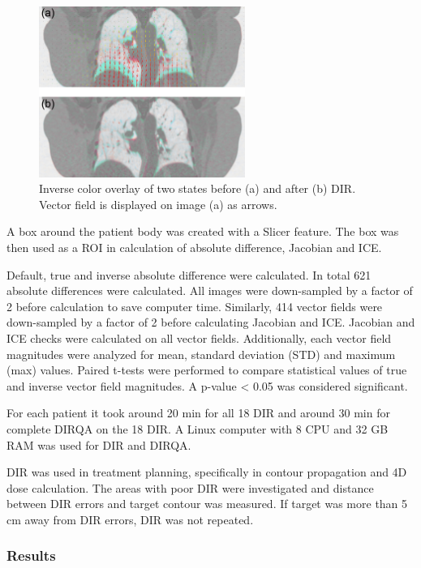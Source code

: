 \begin{figure}[H]
	\begin{center}		
		\includegraphics[width=0.6\textwidth]{./Vmm/Images/exampleReg.png}
		\caption{Inverse color overlay of two states before (a) and after (b) DIR. Vector field is displayed on image (a) as arrows.}
		\label{exampleReg_lung}
	\end{center}
\end{figure}

A box around the patient body was created with a Slicer feature. The box was then used as a ROI in calculation of absolute difference, Jacobian and ICE.

Default, true and inverse absolute difference were calculated. In total 621 absolute differences were calculated. All images were down-sampled by a factor of 2
before calculation to save computer time. Similarly, 414 vector fields were down-sampled by a factor of 2 before calculating Jacobian and ICE. Jacobian and ICE checks were calculated on all vector fields.
Additionally, each vector field magnitudes were analyzed for mean, standard deviation (STD) and maximum (max) values. Paired t-tests were performed to compare statistical values of true and inverse vector field magnitudes.
A p-value < 0.05 was considered significant. 


For each patient it took around 20 min for all 18 DIR and around 30 min for complete DIRQA on the 18 DIR. A Linux computer with 8 CPU and 32 GB RAM was used for DIR and DIRQA.

DIR was used in treatment planning, specifically in contour propagation and 4D dose calculation. The areas with poor DIR were investigated and distance between DIR errors 
and target contour was measured. If target was more than 5 cm away from DIR errors, DIR was not repeated.


\subsubsection{Results}

